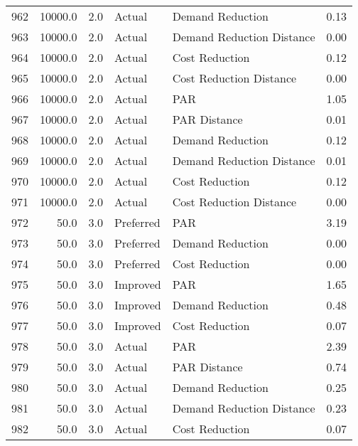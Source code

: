 \begin{longtable}{lrrllr}
962  &      10000.0 &     2.0 &         Actual &           Demand Reduction &   0.13 \\
963  &      10000.0 &     2.0 &         Actual &  Demand Reduction Distance &   0.00 \\
964  &      10000.0 &     2.0 &         Actual &             Cost Reduction &   0.12 \\
965  &      10000.0 &     2.0 &         Actual &    Cost Reduction Distance &   0.00 \\
966  &      10000.0 &     2.0 &         Actual &                        PAR &   1.05 \\
967  &      10000.0 &     2.0 &         Actual &               PAR Distance &   0.01 \\
968  &      10000.0 &     2.0 &         Actual &           Demand Reduction &   0.12 \\
969  &      10000.0 &     2.0 &         Actual &  Demand Reduction Distance &   0.01 \\
970  &      10000.0 &     2.0 &         Actual &             Cost Reduction &   0.12 \\
971  &      10000.0 &     2.0 &         Actual &    Cost Reduction Distance &   0.00 \\
972  &         50.0 &     3.0 &      Preferred &                        PAR &   3.19 \\
973  &         50.0 &     3.0 &      Preferred &           Demand Reduction &   0.00 \\
974  &         50.0 &     3.0 &      Preferred &             Cost Reduction &   0.00 \\
975  &         50.0 &     3.0 &       Improved &                        PAR &   1.65 \\
976  &         50.0 &     3.0 &       Improved &           Demand Reduction &   0.48 \\
977  &         50.0 &     3.0 &       Improved &             Cost Reduction &   0.07 \\
978  &         50.0 &     3.0 &         Actual &                        PAR &   2.39 \\
979  &         50.0 &     3.0 &         Actual &               PAR Distance &   0.74 \\
980  &         50.0 &     3.0 &         Actual &           Demand Reduction &   0.25 \\
981  &         50.0 &     3.0 &         Actual &  Demand Reduction Distance &   0.23 \\
982  &         50.0 &     3.0 &         Actual &             Cost Reduction &   0.07 \\

\end{longtable}

